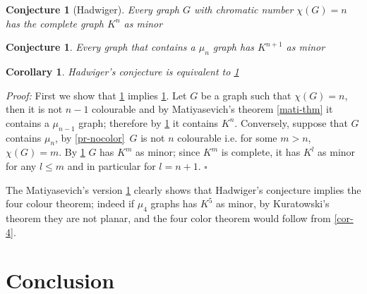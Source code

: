 \documentclass[a4paper,12pt,oneside]{book}
\newtheorem{corollary}[theorem]{Corollary}
\newtheorem{conjecture}[theorem]{Conjecture}
\newcommand*{\QED}{\hfill\ensuremath{\square}}
\begin{document}
\begin{conjecture}[Hadwiger]\label{hadw}
Every graph $G$ with chromatic number $\chi (G)=n$ has the complete graph $K^n$  as minor \end{conjecture}

\begin{conjecture}\label{hadw_mu}
Every graph that contains a $\mu_n$ graph has $K^{n+1}$  as minor \end{conjecture}

\begin{corollary}
Hadwiger's conjecture is equivalent to \ref{hadw_mu}\end{corollary}
\textit{Proof:} First we show that \ref{hadw_mu} implies \ref{hadw}. Let $G$ be a graph such that $\chi (G)=n$, then it is not $n-1$ colourable and by Matiyasevich's theorem \ref{mati-thm} it contains a $\mu_{n-1}$ graph; therefore by \ref{hadw_mu} it contains $K^n$.
Conversely, suppose that $G$ contains $\mu_n$, by \ref{pr-nocolor} $\,G$ is not $n$ colourable i.e. for some $m>n$, $\chi (G)=m$. By \ref{hadw} $G$ has $K^m$ as minor; since $K^m$ is complete, it has $K^l$ as minor for any $l\leq m$ and in particular for $l=n+1$. \QED

\noindent The Matiyasevich's version \ref{hadw_mu} clearly shows  that Hadwiger's conjecture implies the four colour theorem; indeed if $\mu_4$ graphs has $K^5$ as minor, by Kuratowski's theorem they are not planar, and the four color theorem would follow from \ref{cor-4}.


\chapter*{Conclusion}
\end{document}
